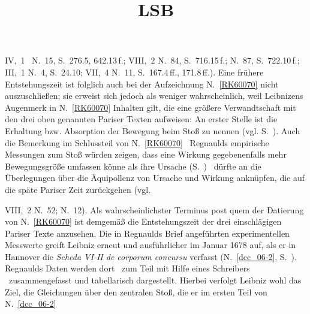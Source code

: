 \begin{ledgroup}
IV,~1 \rbrack\ N.~15, S.~276.5, 642.13\,f.;\cite{01347} %
VIII,~2 N.~84, S.~716.15\,f.;\cite{01348} %
N.~87, S.~722.10\,f.;\cite{01349} %
III,~1 N.~4, S.~24.10;\cite{01350} %
VII,~4 N.~11, S.~167.4\,ff., 171.8\,ff.\cite{01353}). %
Eine frühere Entstehungszeit ist folglich auch bei der Aufzeichnung N.~\ref{RK60070} %
nicht auszuschließen; sie erweist sich jedoch als weniger wahrscheinlich, weil Leibnizens Augenmerk in N.~\ref{RK60070} %
Inhalten gilt, die eine größere Verwandtschaft mit den drei oben genannten Pariser Texten aufweisen:
An erster Stelle ist die Erhaltung bzw. Absorption der Bewegung beim Stoß zu nennen (vgl. S.~).
Auch die Bemerkung im Schlussteil von N.~\ref{RK60070} %
\textendash\ Regnaulds empirische Messungen zum Stoß würden zeigen, dass eine Wirkung gegebenenfalls mehr Bewegungsgröße umfassen könne als ihre Ursache (S.~) \textendash\ dürfte an die Überlegungen über die Äquipollenz von Ursache und Wirkung anknüpfen, die auf die späte Pariser Zeit zurückgehen (vgl.
\title{LSB} VIII,~2 N.~52;\cite{01351} %
N.~12\cite{01352}). %
Als wahrscheinlichster Terminus post quem der Datierung von N.~\ref{RK60070} %
ist demgemäß die Entstehungszeit der drei einschlägigen Pariser Texte %
anzusehen. 
\pend%
%
\pstart%
Die in Regnaulds Brief angeführten experimentellen Messwerte greift Leibniz erneut und ausführlicher im Januar 1678 auf, als er in Hannover die \textit{Scheda VI-II de corporum concursu} verfasst (N.~\ref{dcc_06-2}, %
S.~\pageref{37_04_059r_Regnauld_Anfang}\textendash\pageref{37_04_060r_Regnauld_Ende}).
Regnaulds Daten werden dort \textendash\ zum Teil mit Hilfe eines Schreibers \textendash\ zusammengefasst und tabellarisch dargestellt.
Hierbei verfolgt Leibniz wohl das Ziel, die Gleichungen über den zentralen Stoß, die er im ersten Teil von N.~\ref{dcc_06-2} %

\end{ledgroup}
